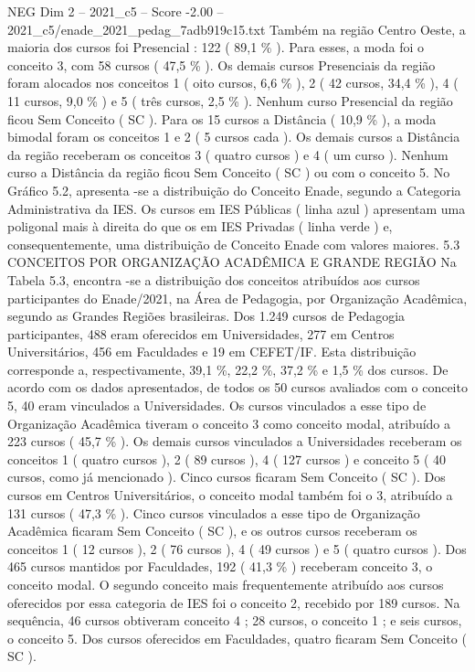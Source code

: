 \begin{textsample}{NEG Dim 2 – 2021\_c5 – Score -2.00 – 2021\_c5/enade\_2021\_pedag\_7adb919c15.txt}
Também na região Centro Oeste, a maioria dos cursos foi Presencial : 122 ( 89,1 \% ).
Para esses, a moda foi o conceito 3, com 58 cursos ( 47,5 \% ).
Os demais cursos Presenciais da região foram alocados nos conceitos 1 ( oito cursos, 6,6 \% ), 2 ( 42 cursos, 34,4 \% ), 4 ( 11 cursos, 9,0 \% ) e 5 ( três cursos, 2,5 \% ).
Nenhum curso Presencial da região ficou Sem Conceito ( SC ).
Para os 15 cursos a Distância ( 10,9 \% ), a moda bimodal foram os conceitos 1 e 2 ( 5 cursos cada ).
Os demais cursos a Distância da região receberam os conceitos 3 ( quatro cursos ) e 4 ( um curso ).
Nenhum curso a Distância da região ficou Sem Conceito ( SC ) ou com o conceito 5.
No Gráfico 5.2, apresenta -se a distribuição do Conceito Enade, segundo a Categoria Administrativa da IES.
Os cursos em IES Públicas ( linha azul ) apresentam uma poligonal mais à direita do que os em IES Privadas ( linha verde ) e, consequentemente, uma distribuição de Conceito Enade com valores maiores. 5.3 CONCEITOS POR ORGANIZAÇÃO ACADÊMICA E GRANDE REGIÃO Na Tabela 5.3, encontra -se a distribuição dos conceitos atribuídos aos cursos participantes do Enade/2021, na Área de Pedagogia, por Organização Acadêmica, segundo as Grandes Regiões brasileiras.
Dos 1.249 cursos de Pedagogia participantes, 488 eram oferecidos em Universidades, 277 em Centros Universitários, 456 em Faculdades e 19 em CEFET/IF.
Esta distribuição corresponde a, respectivamente, 39,1 \%, 22,2 \%, 37,2 \% e 1,5 \% dos cursos.
De acordo com os dados apresentados, de todos os 50 cursos avaliados com o conceito 5, 40 eram vinculados a Universidades.
Os cursos vinculados a esse tipo de Organização Acadêmica tiveram o conceito 3 como conceito modal, atribuído a 223 cursos ( 45,7 \% ).
Os demais cursos vinculados a Universidades receberam os conceitos 1 ( quatro cursos ), 2 ( 89 cursos ), 4 ( 127 cursos ) e conceito 5 ( 40 cursos, como já mencionado ).
Cinco cursos ficaram Sem Conceito ( SC ).
Dos cursos em Centros Universitários, o conceito modal também foi o 3, atribuído a 131 cursos ( 47,3 \% ).
Cinco cursos vinculados a esse tipo de Organização Acadêmica ficaram Sem Conceito ( SC ), e os outros cursos receberam os conceitos 1 ( 12 cursos ), 2 ( 76 cursos ), 4 ( 49 cursos ) e 5 ( quatro cursos ).
Dos 465 cursos mantidos por Faculdades, 192 ( 41,3 \% ) receberam conceito 3, o conceito modal.
O segundo conceito mais frequentemente atribuído aos cursos oferecidos por essa categoria de IES foi o conceito 2, recebido por 189 cursos.
Na sequência, 46 cursos obtiveram conceito 4 ; 28 cursos, o conceito 1 ; e seis cursos, o conceito 5.
Dos cursos oferecidos em Faculdades, quatro ficaram Sem Conceito ( SC ).

\end{textsample}
